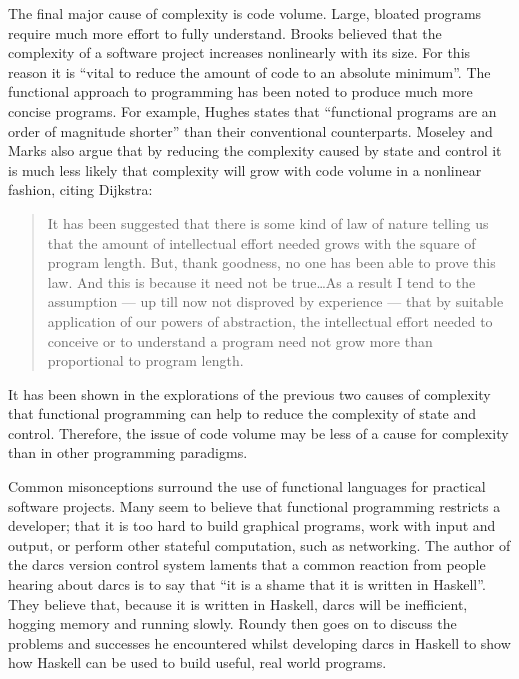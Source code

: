 The final major cause of complexity is code volume. Large, bloated programs
require much more effort to fully understand. Brooks believed that the complexity
of a software project increases nonlinearly with its size.\cite[1em]{brooks1987bullet}
For this reason it is ``vital to reduce the amount of code to an absolute
minimum''.\cite[1em]{moseley2006tarpit} The functional approach to programming
has been noted to produce much more concise programs. For example, Hughes
states that ``functional programs are an order of magnitude shorter'' than
their conventional counterparts.\cite[1em]{hughes1989whyfp} Moseley and Marks
also argue that by reducing the complexity caused by state and control it
is much less likely that complexity will grow with code volume in a nonlinear
fashion, citing Dijkstra:\cite[1em]{dijkstra1972humble}

\begin{quote}
It has been suggested that there is some kind of law of nature telling us that
the amount of intellectual effort needed grows with the square of program length.
But, thank goodness, no one has been able to prove this law. And this is because
it need not be true\ldots As a result I tend to the assumption --- up till now
not disproved by experience --- that by suitable application of our powers of
abstraction, the intellectual effort needed to conceive or to understand a program
need not grow more than proportional to program length.
\end{quote}
\noindent
It has been shown in the explorations of the previous two causes of complexity
that functional programming can help to reduce the complexity of state and
control. Therefore, the issue of code volume may be less of a cause for complexity
than in other programming paradigms.

Common misonceptions surround the use of functional languages for practical
software projects. Many seem to believe that functional programming restricts
a developer; that it is too hard to build graphical programs, work with input
and output, or perform other stateful computation, such as networking.
The author of the darcs version control system laments that a common reaction
from people hearing about darcs is to say that ``it is a shame that it is
written in Haskell''.\cite{roundy2005darcs} They believe that, because it is
written in Haskell, darcs will be inefficient, hogging memory and running slowly.
Roundy then goes on to discuss the problems and successes he encountered whilst
developing darcs in Haskell to show how Haskell can be used to build useful, real
world programs.

